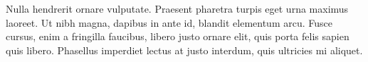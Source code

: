 \enlargethispage{2em}

Nulla hendrerit ornare vulputate. Praesent pharetra turpis eget urna maximus laoreet. Ut nibh magna, dapibus in ante id, blandit elementum arcu. Fusce cursus, enim a fringilla faucibus, libero justo ornare elit, quis porta felis sapien quis libero.
 Phasellus imperdiet lectus at justo interdum, quis ultricies mi aliquet. 

